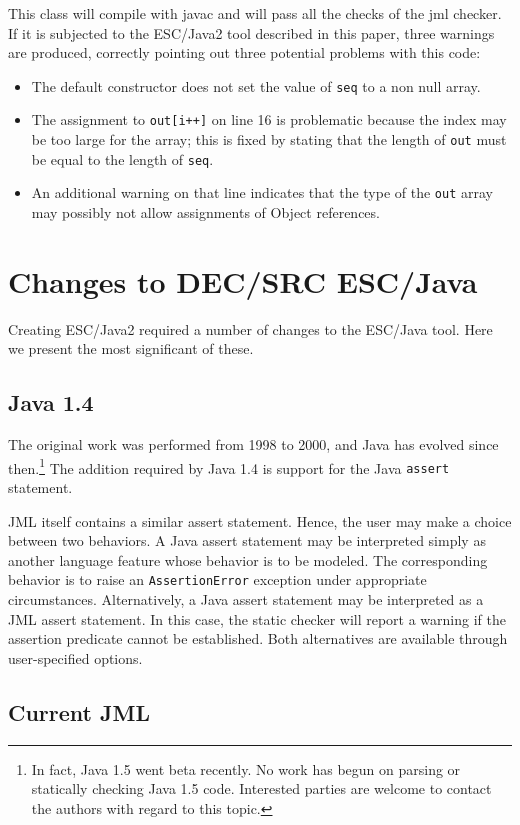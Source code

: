 \documentclass{llncs}
\begin{document}
This class will compile with javac and will pass all the checks of the jml checker.  If it is subjected to the ESC/Java2 tool described in this paper, three warnings are produced, correctly pointing out three potential problems with this code:
\begin{itemize}
\item The default constructor does not set the value of \texttt{seq} to a non null array.
\item The assignment to \texttt{out[i++]} on line 16 is problematic because the index may be too large for the array; this is fixed by stating that the length of \texttt{out} must be equal to the length of \texttt{seq}.
\item An additional warning on that line indicates that the type of the \texttt{out} array may possibly not allow
assignments of Object references.
\end{itemize} 
\section{Changes to DEC/SRC ESC/Java}

Creating ESC/Java2 required a number of changes to the ESC/Java tool.
Here we present the most significant of these.

\subsection{Java 1.4}

The original work was performed from 1998 to 2000, and Java has
evolved since then.\footnote{In fact, Java 1.5 went beta recently.  No
  work has begun on parsing or statically checking Java 1.5 code.
  Interested parties are welcome to contact the authors with regard to
  this topic.}  The addition required by Java 1.4 is support for the
Java {\tt assert} statement.

JML itself contains a similar assert statement.  Hence, the user may
make a choice between two behaviors.  A Java assert statement may be
interpreted simply as another language feature whose behavior is to be
modeled.  The corresponding behavior is to raise an
\texttt{AssertionError} exception under appropriate circumstances.
Alternatively, a Java assert statement may be interpreted as a JML
assert statement.  In this case, the static checker will report a
warning if the assertion predicate cannot be established.  Both
alternatives are available through user-specified options.

\subsection{Current JML}
\end{document}
